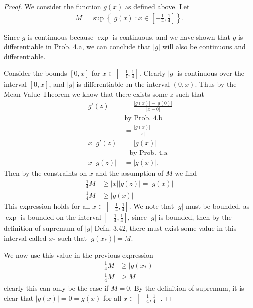\documentclass[12pt]{amsart}
\newcommand{\prob}[1]{Prob. #1}
\newcommand{\defn}[1]{Defn. #1}
\begin{document}
\begin{proof}
  We consider the function $g(x)$ as defined above. Let
  \begin{align*}
    M=\sup\left\{|g(x)|:x\in\left[-\frac{1}{4},\frac{1}{4}\right]\right\}.
  \end{align*}

  Since $g$ is continuous because $\exp$ is continuous, and we have shown that
  $g$ is differentiable in \prob{4.a}, we can conclude that $|g|$ will also be
  continuous and differentiable.

  Consider the bounds $\left[0, x\right]$ for $x\in\left[-\frac{1}{4},
  \frac{1}{4}\right]$. Clearly $|g|$ is continuous over the interval $[0,x]$,
  and $|g|$ is differentiable on the interval $(0,x)$. Thus by the Mean Value
  Theorem we know that there exists some $z$ such that
  \begin{align*}
    \left| g'(z)\right|&=\frac{|g(x)|-|g(0)|}{|x-0|}\\
                       &\text{by \prob{4.b}}\\
                       &=\frac{|g(x)|}{|x|}\\
    |x||g'(z)|&=|g(x)|\\
              &=\text{by \prob{4.a}}\\
    |x||g(z)|&=|g(x)|.
  \end{align*}
  Then by the constraints on $x$ and the assumption of $M$ we find
  \begin{align*}
    \frac{1}{4}M&\geq|x||g(z)|=|g(x)|\\
    \frac{1}{4}M&\geq|g(x)|
  \end{align*}
  This expression holds for all $x\in\left[-\frac{1}{4},\frac{1}{4}\right]$. We
  note that $|g|$ must be bounded, as $\exp$ is bounded on the interval
  $\left[-\frac{1}{4},\frac{1}{4}\right]$, since $|g|$ is bounded, then by the
  definition of supremum of $|g|$ \defn{3.42}, there must exist some value in
  this interval called $x_*$ such that $|g(x_*)|=M$.

  We now use this value in the previous expression
  \begin{align*}
    \frac{1}{4}M&\geq|g(x_*)|\\
    \frac{1}{4}M&\geq M
  \end{align*}
  clearly this can only be the case if $M=0$. By the definition of supremum, it
  is clear that $|g(x)|=0=g(x)$ for all
  $x\in\left[-\frac{1}{4},\frac{1}{4}\right]$.
\end{proof}
\end{document}
